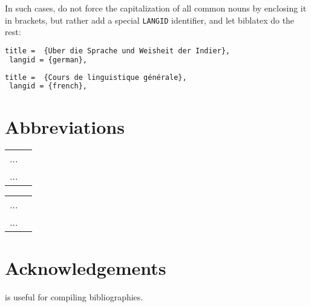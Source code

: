 \documentclass[output=paper,colorlinks,citecolor=brown,chinesefont]{langscibook}
\begin{document}
{In such cases, do not force the capitalization of all common nouns by enclosing it in brackets, but rather add a special \texttt{LANGID} identifier, and let biblatex do the rest:

\begin{lstlisting}[language=tex]
 title =  {Über die Sprache und Weisheit der Indier},
 langid = {german},
\end{lstlisting}

\begin{lstlisting}[language=tex]
 title =  {Cours de linguistique générale},
 langid = {french},
\end{lstlisting}

\section*{Abbreviations}
\label{sec:abbreviations:Chen}


\begin{tabularx}{.5\textwidth}{@{}lQ@{}}
... & \\
... & \\
\end{tabularx}%
\begin{tabularx}{.5\textwidth}{@{}lQ@{}}
... & \\
... & \\
\end{tabularx}
\section*{Acknowledgements}
\citet{Nordhoff2018} is useful for compiling bibliographies.
}
\sloppy
\printbibliography[heading=subbibliography,notkeyword=this]
\end{document}
